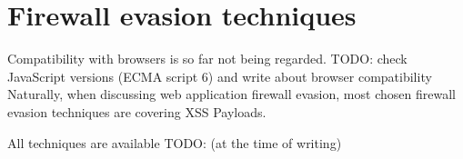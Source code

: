\section{Firewall evasion techniques}
\label{sec:firewallevasiontechniques}

{\color{red} Compatibility with browsers is so far not being regarded. TODO: check JavaScript versions (ECMA script 6) and write about browser compatibility}
Naturally, when discussing web application firewall evasion, most chosen firewall evasion techniques are covering XSS Payloads.

All techniques are available {\color{red} TODO: (at the time of writing)}




